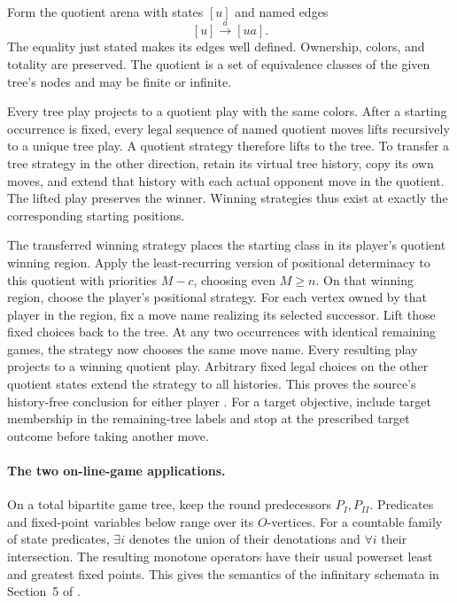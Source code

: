 Form the quotient arena
with states \([u]\)
and named edges
\[
 [u]\xrightarrow{a}[ua].
\]
The equality just stated
makes its edges well
defined. Ownership, colors,
and totality are preserved.
The quotient is a
set of equivalence classes
of the given tree's
nodes and may be
finite or infinite.

Every tree play projects
to a quotient play
with the same colors.
After a starting occurrence
is fixed, every legal
sequence of named quotient
moves lifts recursively
to a unique tree play.
A quotient strategy
therefore lifts to the
tree. To transfer a
tree strategy in the
other direction, retain
its virtual tree history,
copy its own moves,
and extend that history
with each actual opponent
move in the quotient.
The lifted play preserves
the winner. Winning
strategies thus exist
at exactly the corresponding
starting positions.

The transferred winning strategy
places the starting class in
its player's quotient winning
region. Apply the least-recurring
version of positional determinacy
to this quotient with priorities
\(M-c\), choosing even \(M\geq n\).
On that winning region, choose
the player's positional strategy.
For each vertex owned by that
player in the region, fix a
move name realizing its selected
successor. Lift those
fixed choices back to
the tree.
At any two occurrences
with identical remaining
games, the strategy now
chooses the same move
name. Every resulting
play projects to a
winning quotient play.
Arbitrary fixed legal
choices on the other
quotient states extend
the strategy to all
histories.
This proves the source's
history-free conclusion
for either player
\cite[thm.~4.4]{EmersonJutla1991}.
For a target objective,
include target membership
in the remaining-tree
labels and stop at
the prescribed target
outcome before taking
another move.

\paragraph{The two on-line-game applications.}
\label{sec:p09-emerson-jutla-fsigma}
On a total bipartite game
tree, keep the round
predecessors \(P_I,P_{II}\).
Predicates and fixed-point
variables below range over
its \(O\)-vertices.
For a countable family
of state predicates,
\(\exists i\) denotes
the union of their
denotations and \(\forall i\)
their intersection.
The resulting monotone
operators have their usual
powerset least and greatest
fixed points. This gives
the semantics of the
infinitary schemata in
Section~5 of
\cite{EmersonJutla1991}.

